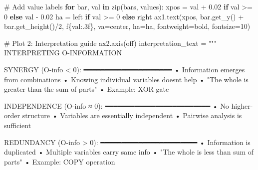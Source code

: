 \documentclass[
  11pt,
  letterpaper,
  oneside,
  openany]{book}
\newenvironment{Shaded}{\begin{snugshade}}{\end{snugshade}}
\newcommand{\BuiltInTok}[1]{\textcolor[rgb]{0.00,0.23,0.31}{#1}}
\newcommand{\CommentTok}[1]{\textcolor[rgb]{0.37,0.37,0.37}{#1}}
\newcommand{\ControlFlowTok}[1]{\textcolor[rgb]{0.00,0.23,0.31}{\textbf{#1}}}
\newcommand{\DecValTok}[1]{\textcolor[rgb]{0.68,0.00,0.00}{#1}}
\newcommand{\FloatTok}[1]{\textcolor[rgb]{0.68,0.00,0.00}{#1}}
\newcommand{\KeywordTok}[1]{\textcolor[rgb]{0.00,0.23,0.31}{\textbf{#1}}}
\newcommand{\NormalTok}[1]{\textcolor[rgb]{0.00,0.23,0.31}{#1}}
\newcommand{\OperatorTok}[1]{\textcolor[rgb]{0.37,0.37,0.37}{#1}}
\newcommand{\SpecialCharTok}[1]{\textcolor[rgb]{0.37,0.37,0.37}{#1}}
\newcommand{\SpecialStringTok}[1]{\textcolor[rgb]{0.13,0.47,0.30}{#1}}
\newcommand{\StringTok}[1]{\textcolor[rgb]{0.13,0.47,0.30}{#1}}
\begin{document}
\begin{Shaded}
\begin{Highlighting}[]
\CommentTok{\# Add value labels}
\ControlFlowTok{for}\NormalTok{ bar, val }\KeywordTok{in} \BuiltInTok{zip}\NormalTok{(bars, values):}
\NormalTok{    xpos }\OperatorTok{=}\NormalTok{ val }\OperatorTok{+} \FloatTok{0.02} \ControlFlowTok{if}\NormalTok{ val }\OperatorTok{\textgreater{}=} \DecValTok{0} \ControlFlowTok{else}\NormalTok{ val }\OperatorTok{{-}} \FloatTok{0.02}
\NormalTok{    ha }\OperatorTok{=} \StringTok{\textquotesingle{}left\textquotesingle{}} \ControlFlowTok{if}\NormalTok{ val }\OperatorTok{\textgreater{}=} \DecValTok{0} \ControlFlowTok{else} \StringTok{\textquotesingle{}right\textquotesingle{}}
\NormalTok{    ax1.text(xpos, bar.get\_y() }\OperatorTok{+}\NormalTok{ bar.get\_height()}\OperatorTok{/}\DecValTok{2}\NormalTok{, }\SpecialStringTok{f\textquotesingle{}}\SpecialCharTok{\{}\NormalTok{val}\SpecialCharTok{:.3f\}}\SpecialStringTok{\textquotesingle{}}\NormalTok{, }
\NormalTok{             va}\OperatorTok{=}\StringTok{\textquotesingle{}center\textquotesingle{}}\NormalTok{, ha}\OperatorTok{=}\NormalTok{ha, fontweight}\OperatorTok{=}\StringTok{\textquotesingle{}bold\textquotesingle{}}\NormalTok{, fontsize}\OperatorTok{=}\DecValTok{10}\NormalTok{)}

\CommentTok{\# Plot 2: Interpretation guide}
\NormalTok{ax2.axis(}\StringTok{\textquotesingle{}off\textquotesingle{}}\NormalTok{)}
\NormalTok{interpretation\_text }\OperatorTok{=} \StringTok{"""}
\StringTok{INTERPRETING O{-}INFORMATION}

\StringTok{SYNERGY (O{-}info \textless{} 0):}
\StringTok{━━━━━━━━━━━━━━━━━━━━━}
\StringTok{• Information emerges from combinations}
\StringTok{• Knowing individual variables doesn\textquotesingle{}t help}
\StringTok{• "The whole is greater than the sum of parts"}
\StringTok{• Example: XOR gate}

\StringTok{INDEPENDENCE (O{-}info ≈ 0):}
\StringTok{━━━━━━━━━━━━━━━━━━━━━━━━━}
\StringTok{• No higher{-}order structure}
\StringTok{• Variables are essentially independent}
\StringTok{• Pairwise analysis is sufficient}

\StringTok{REDUNDANCY (O{-}info \textgreater{} 0):}
\StringTok{━━━━━━━━━━━━━━━━━━━━━━━}
\StringTok{• Information is duplicated}
\StringTok{• Multiple variables carry same info}
\StringTok{• "The whole is less than sum of parts"}
\StringTok{• Example: COPY operation}


\end{Highlighting}
\end{Shaded}
\end{document}

